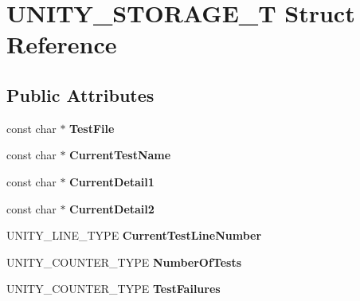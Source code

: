 \hypertarget{structUNITY__STORAGE__T}{}\section{U\+N\+I\+T\+Y\+\_\+\+S\+T\+O\+R\+A\+G\+E\+\_\+T Struct Reference}
\label{structUNITY__STORAGE__T}
\subsection*{Public Attributes}
\begin{DoxyCompactItemize}
\item 
\mbox{\label{structUNITY__STORAGE__T_a69613e2d9945fc1ce5a4848613828a1f}} 
const char $\ast$ {\bfseries Test\+File}
\item 
\mbox{\label{structUNITY__STORAGE__T_a0d7f8bf6c8a95ebe237d411f1fc7e345}} 
const char $\ast$ {\bfseries Current\+Test\+Name}
\item 
\mbox{\label{structUNITY__STORAGE__T_a21674715adf3d4d1ac7f0c459887cf9d}} 
const char $\ast$ {\bfseries Current\+Detail1}
\item 
\mbox{\label{structUNITY__STORAGE__T_a9d821447e216e215911e8726aa986eec}} 
const char $\ast$ {\bfseries Current\+Detail2}
\item 
\mbox{\label{structUNITY__STORAGE__T_aaae2021491b025aabcc55edb3ca5bedf}} 
U\+N\+I\+T\+Y\+\_\+\+L\+I\+N\+E\+\_\+\+T\+Y\+PE {\bfseries Current\+Test\+Line\+Number}
\item 
\mbox{\label{structUNITY__STORAGE__T_a144a353d362e1c98bdbc963443b268dc}} 
U\+N\+I\+T\+Y\+\_\+\+C\+O\+U\+N\+T\+E\+R\+\_\+\+T\+Y\+PE {\bfseries Number\+Of\+Tests}
\item 
\mbox{\label{structUNITY__STORAGE__T_a6a5463da7d0010ce4f9d80ff0647c7d4}} 
U\+N\+I\+T\+Y\+\_\+\+C\+O\+U\+N\+T\+E\+R\+\_\+\+T\+Y\+PE {\bfseries Test\+Failures}
\item 
\mbox{\label{structUNITY__STORAGE__T_ab0ea61a39989b54885e805e6a35ff300}} 

\end{DoxyCompactItemize}
